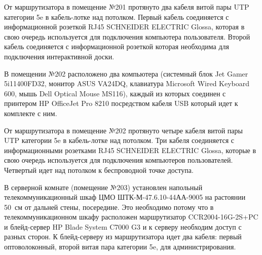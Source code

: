 От маршрутизатора в помещение №201 протянуто два кабеля витой пары UTP категории 5e в кабель-лотке над потолком. Первый кабель соединяется с информационной розеткой RJ45 SCHNEIDER ELECTRIC Glossa, которая в свою очередь используется для подключения компьютера пользователя. Второй кабель соединяется с информационной розеткой которая необходима для подключения интерактивной доски.

В помещении №202 расположено два компьютера (системный блок Jet Gamer 5i11400FD32, монитор ASUS VA24DQ, клавиатура Microsoft Wired Keyboard 600, мышь Dell Optical Mouse MS116), каждый из которых соединен с принтером HP OfficeJet Pro 8210 посредством кабеля USB который идет к комплекте с ним. 

От маршрутизатора в помещение №202 протянуто четыре кабеля витой пары UTP категории 5e в кабель-лотке над потолком. Три кабеля соединяется с информационными розетками RJ45 SCHNEIDER ELECTRIC Glossa, которые в свою очередь используется для подключения компьютеров пользователей. Четвертый идет над потолком к беспроводной точке доступа.

В серверной комнате (помещение №203) установлен напольный телекоммуникационный шкаф ЦМО ШТК-М-47.6.10-44АА-9005 на растоянии 50~см от дальней стены, посередине. Это необходимо потому что в телекоммуникационном шкафу расположен маршрутизатор CCR2004-16G-2S+PC и блейд-сервер HP Blade System C7000 G3 и к серверу необходим доступ с разных сторон. К блейд-серверу из маршрутизатора идет два кабеля: первый оптоволоконный, второй витая пара категории 5e, для администрирования.
